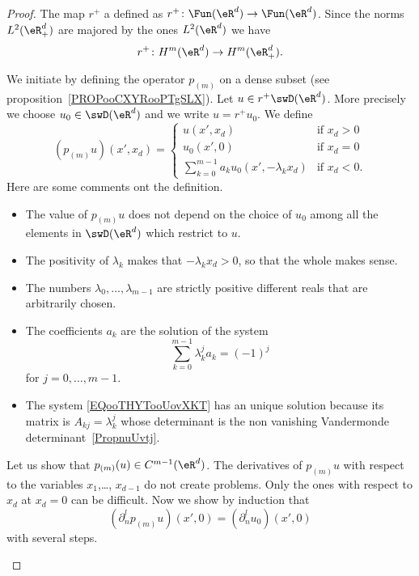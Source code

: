 \begin{proof}
    The map \( r^+\) a defined as \( r^+\colon \Fun(\eR^d)\to \Fun(\eR^d)\). Since the norms \( L^2(\eR^d_+)\) are majored by the ones \( L^2(\eR^d)\) we have
    \begin{equation}
        r^+\colon H^m(\eR^d)\to H^m(\eR^d_+).
    \end{equation}

    We initiate by defining the operator \( p_{(m)}\) on a dense subset (see proposition~\ref{PROPooCXYRooPTgSLX}).  Let \( u\in r^+\swD(\eR^d)\). More precisely we choose \( u_0\in\swD(\eR^d)\) and we write \( u=r^+u_0\). We define
    \begin{equation}
        (p_{(m)}u)(x',x_d)=\begin{cases}
            u(x',x_d)    &   \text{if } x_d> 0\\
            u_0(x',0) & \text{if }  x_d=0\\
            \sum_{k=0}^{m-1}a_ku_0(x',-\lambda_kx_d)    &    \text{if } x_d<0.
        \end{cases}
    \end{equation}
    Here are some comments ont the definition.
    \begin{itemize}
        \item
            The value of \( p_{(m)}u\) does not depend on the choice of \( u_0\) among all the elements in \( \swD(\eR^d)\) which restrict to \( u\).
        \item
     The positivity of \( \lambda_k\) makes that \( -\lambda_kx_d>0\), so that the whole makes sense.
 \item
    The numbers \( \lambda_0,\ldots,\lambda_{m-1}\) are strictly positive different reals that are arbitrarily chosen.
\item
    The coefficients \( a_k\) are the solution of the system
    \begin{equation}        \label{EQooTHYTooUovXKT}
        \sum_{k=0}^{m-1}\lambda_k^ja_k=(-1)^j
    \end{equation}
    for \( j=0,\ldots, m-1\).
    \item
        The system \eqref{EQooTHYTooUovXKT} has an unique solution because its matrix is \( A_{kj}=\lambda_k^j\) whose determinant is the non vanishing Vandermonde determinant~\ref{PropnuUvtj}.
    \end{itemize}

    Let us show that \( p_{(m)}(u)\in C^{m-1}(\eR^d)\). The derivatives of \( p_{(m)}u\) with respect to the variables \( x_1\),\ldots, \( x_{d-1}\) do not create problems. Only the ones with respect to \( x_d\) at \( x_d=0\) can be difficult. Now we show by induction that
            \begin{equation}
                (\partial_n^lp_{(m)}u)(x',0)=(\partial_n^lu_0)(x',0)
            \end{equation}
            with several steps.
    \begin{subproof}
        \spitem[First: \( (\partial_np_{(m)}u)(x',0)=(\partial_nu_0)(x',0)\)]


\end{subproof}
\end{proof}
